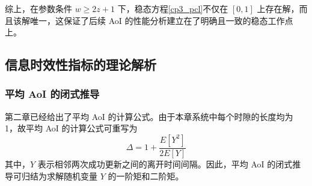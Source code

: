 综上，在参数条件 $w\ge 2z+1$ 下，稳态方程\eqref{cp3_pcl}不仅在 $[0,1]$ 上存在解，而且该解唯一，这保证了后续 AoI 的性能分析建立在了明确且一致的稳态工作点上。

\subsection{信息时效性指标的理论解析}
\subsubsection{平均 AoI 的闭式推导}

第二章已经给出了平均 AoI 的计算公式。由于本章系统中每个时隙的长度均为 1，故平均 AoI 的计算公式可重写为
\begin{equation}\label{cp3_avg_aoi}
    \Delta = 1 + \frac{E[Y^2]}{2E[Y]}
\end{equation}
其中，$Y$ 表示相邻两次成功更新之间的离开时间间隔。因此，平均 AoI 的闭式推导可归结为求解随机变量 $Y$ 的一阶矩和二阶矩。

